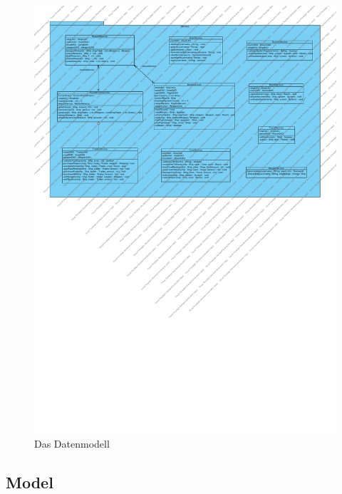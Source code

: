 \documentclass[fontsize=12pt,paper=a4,twoside]{scrartcl}
\begin{document}
\begin{figure}[H]
\begin{center}
  \includegraphics[width=\linewidth]{../GT_Modulsicht/src/Service.pdf}
    \caption{Das Datenmodell}
\end{center}
\end{figure}

\subsection{Model}
\end{document}
